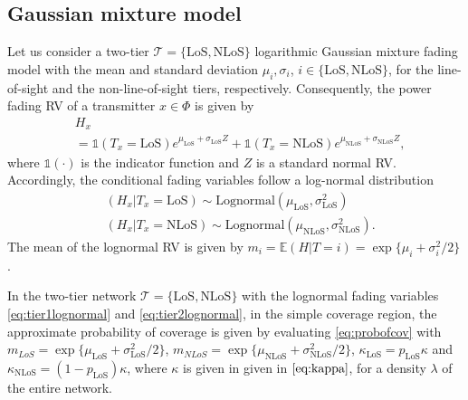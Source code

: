 \documentclass[conference]{IEEEtran}
\theoremstyle{definition}
\theoremstyle{plain}
\begin{document}
          \subsection{Gaussian mixture model}
          Let us consider a two-tier $\mathcal{T} = \{\text{LoS},\text{NLoS}\}$ logarithmic Gaussian mixture fading model with the mean and standard deviation $\mu_{i},\sigma_{i}$, $i \in \{\text{LoS},\text{NLoS} \}$, for the line-of-sight and the non-line-of-sight tiers, respectively. Consequently, the power fading RV of a transmitter $x \in \Phi$ is given by
            \begin{align}
              &H_x  \nonumber \\
              &=   \mathds{1}(T_x =\text{LoS})e^{\mu_{\text{LoS}}+\sigma_{\text{LoS}}Z} +\mathds{1}(T_x =\text{NLoS})e^{\mu_{\text{NLoS}}+\sigma_{\text{NLoS}}Z},
            \end{align}
            where $\mathds{1}(\cdot)$ is the indicator function and $Z$ is a standard normal RV. Accordingly, the conditional fading variables follow a log-normal distribution
            \begin{align}
              \label{eq:tier1lognormal}
              &(H_x|T_x=\text{LoS}) \sim \text{Lognormal}(\mu_{\text{LoS}},\sigma_{\text{LoS}}^2) \\
              &(H_x|T_x=\text{NLoS}) \sim \text{Lognormal}(\mu_{\text{NLoS}},\sigma_{\text{NLoS}}^2).              \label{eq:tier2lognormal}
            \end{align}
            The mean of the lognormal RV is given by $ m_i=\mathbb{E}(H|T=i) = \exp \{\mu_i+\sigma_i^2/2\}$.
            
            In the two-tier network $\mathcal{T} =\{\text{LoS}, \text{NLoS}\}$ with the lognormal fading variables \eqref{eq:tier1lognormal} and \eqref{eq:tier2lognormal}, in the simple coverage region, the approximate probability of coverage is given by evaluating \eqref{eq:probofcov} with $m_{LoS}=\exp \{\mu_{\text{LoS}}+\sigma_{\text{LoS}}^2/2\}$, $m_{NLoS}=\exp \{\mu_{\text{NLoS}}+\sigma_{\text{NLoS}}^2/2\}$, $\mathcal{\kappa}_{\text{LoS}} = p_{\text{LoS}}\kappa$ and $\mathcal{\kappa}_{\text{NLoS}}=(1-p_{\text{LoS}})\kappa$, where $\kappa$ is given in given in $\eqref{eq:kappa}$, for a density $\lambda$ of the entire network.


         
         
             
             
\end{document}
